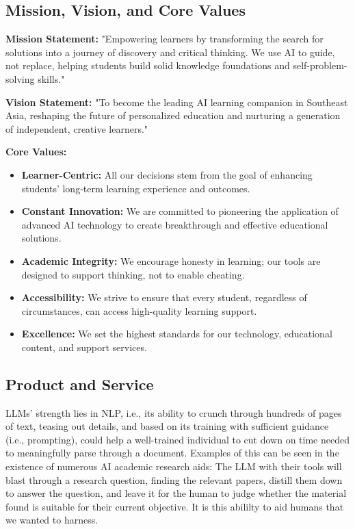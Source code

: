 \subsection{Mission, Vision, and Core Values}

\textbf{Mission Statement:}
"Empowering learners by transforming the search for solutions into a journey of discovery and critical thinking. We use AI to guide, not replace, helping students build solid knowledge foundations and self-problem-solving skills."

\textbf{Vision Statement:}
"To become the leading AI learning companion in Southeast Asia, reshaping the future of personalized education and nurturing a generation of independent, creative learners."

\textbf{Core Values:}
\begin{itemize}
    \item \textbf{Learner-Centric:} All our decisions stem from the goal of enhancing students' long-term learning experience and outcomes.
    \item \textbf{Constant Innovation:} We are committed to pioneering the application of advanced AI technology to create breakthrough and effective educational solutions.
    \item \textbf{Academic Integrity:} We encourage honesty in learning; our tools are designed to support thinking, not to enable cheating.
    \item \textbf{Accessibility:} We strive to ensure that every student, regardless of circumstances, can access high-quality learning support.
    \item \textbf{Excellence:} We set the highest standards for our technology, educational content, and support services.
\end{itemize}

\subsection{Product and Service}
LLMs' strength lies in NLP, i.e., its ability to crunch through hundreds of pages of text, teasing out details, and
based on its training with sufficient guidance (i.e., prompting), could help a well-trained individual to cut down on
time needed to meaningfully parse through a document. Examples of this can be seen in the existence of numerous AI
academic research aids: The LLM with their tools will blast through a research question, finding the relevant papers,
distill them down to answer the question, and leave it for the human to judge whether the material found is suitable
for their current objective. It is this abililty to aid humans that we wanted to harness.

